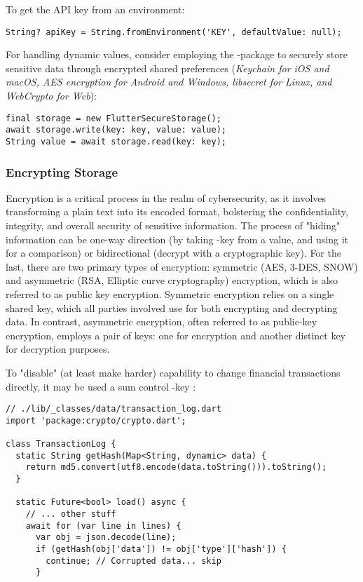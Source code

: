 \noindent To get the API key from an environment:

\begin{lstlisting}
String? apiKey = String.fromEnvironment('KEY', defaultValue: null);
\end{lstlisting}

\noindent For handling dynamic values, consider employing the -package to securely store 
sensitive data through encrypted shared preferences (\emph{Keychain for iOS and macOS, AES encryption for Android and 
Windows, libsecret for Linux, and WebCrypto for Web}):

\begin{lstlisting}
final storage = new FlutterSecureStorage();
await storage.write(key: key, value: value);
String value = await storage.read(key: key);
\end{lstlisting}


\subsubsection{Encrypting Storage}

Encryption is a critical process in the realm of cybersecurity, as it involves transforming a plain text into its 
encoded format, bolstering the confidentiality, integrity, and overall security of sensitive information. The process 
of "hiding" information can be one-way direction (by taking -key from a value, and using it for a comparison) 
or bidirectional (decrypt with a cryptographic key). For the last, there are two primary types of encryption: symmetric 
(AES, 3-DES, SNOW) and asymmetric (RSA, Elliptic curve cryptography) encryption, which is also referred to as public 
key encryption. Symmetric encryption relies on a single shared key, which all parties involved use for both encrypting 
and decrypting data. In contrast, asymmetric encryption, often referred to as public-key encryption, employs a pair of 
keys: one for encryption and another distinct key for decryption purposes.

To "disable" (at least make harder) capability to change financial transactions directly, it may be used a sum control 
-key :

\begin{lstlisting}
// ./lib/_classes/data/transaction_log.dart
import 'package:crypto/crypto.dart';

class TransactionLog {
  static String getHash(Map<String, dynamic> data) {
    return md5.convert(utf8.encode(data.toString())).toString();
  }

  static Future<bool> load() async {
    // ... other stuff
    await for (var line in lines) {
      var obj = json.decode(line);
      if (getHash(obj['data']) != obj['type']['hash']) {
        continue; // Corrupted data... skip
      }
\end{lstlisting}

